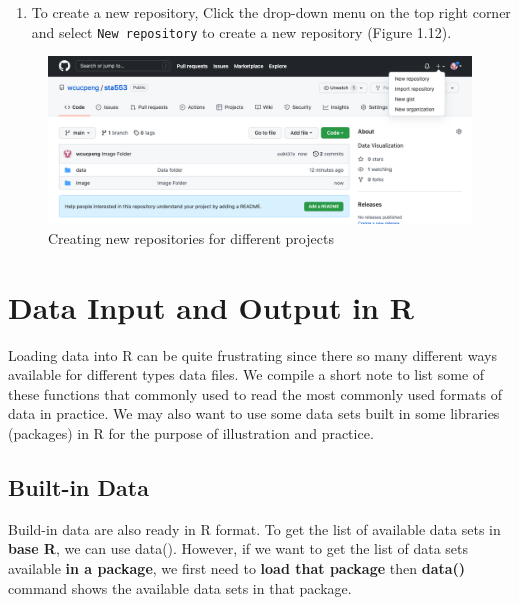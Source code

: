 \documentclass[
]{book}
\providecommand{\tightlist}{%
  \setlength{\itemsep}{0pt}\setlength{\parskip}{0pt}}
\begin{document}
\begin{enumerate}
\def\labelenumi{\arabic{enumi}.}
\setcounter{enumi}{6}
\tightlist
\item
  To create a new repository, Click the drop-down menu on the top right corner and select \texttt{New\ repository} to create a new repository (Figure 1.12).
\end{enumerate}

\begin{figure}

{\centering \includegraphics[width=0.9\linewidth]{img00/CreateNewRepos} 

}

\caption{Creating new repositories for different projects}\label{fig:unnamed-chunk-18}
\end{figure}

\hypertarget{data-input-and-output-in-r}{%
\chapter{Data Input and Output in R}\label{data-input-and-output-in-r}}

Loading data into R can be quite frustrating since there so many different ways available for different types data files. We compile a short note to list some of these functions that commonly used to read the most commonly used formats of data in practice. We may also want to use some data sets built in some libraries (packages) in R for the purpose of illustration and practice.

\hypertarget{built-in-data}{%
\section{Built-in Data}\label{built-in-data}}

Build-in data are also ready in R format. To get the list of available data sets in \textbf{base R}, we can use data(). However, if we want to get the list of data sets available \textbf{in a package}, we first need to \textbf{load that package} then \textbf{data()} command shows the available data sets in that package.
\end{document}
